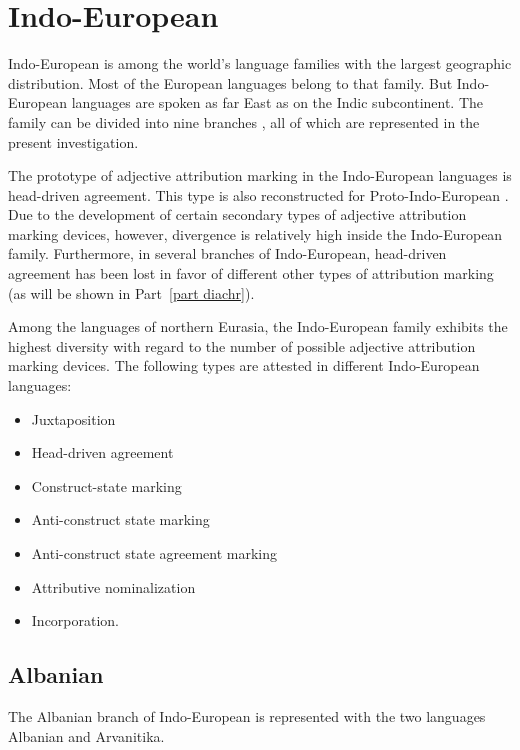 \section{Indo-European}
Indo-European is among the world's language families with the largest geographic distribution. Most of the European languages belong to that family. But Indo-European languages are spoken as far East as on the Indic subcontinent. The family can be divided into nine branches \cite[218]{salminen2007}, all of which are represented in the present investigation.

The prototype of adjective attribution marking in the Indo-European languages is head-driven agreement. This type is also reconstructed for Proto-Indo-European \citep{decsy1991,watkins1998}. Due to the development of certain secondary types of adjective attribution marking devices, however, divergence is relatively high inside the Indo-European family. Furthermore, in several branches of Indo-European, head-driven agreement has been lost in favor of different other types of attribution marking (as will be shown in Part~\ref{part diachr}).

Among the languages of northern Eurasia, the Indo-European family exhibits the highest diversity with regard to the number of possible adjective attribution marking devices. The following types are attested in different Indo-European languages:
\begin{itemize}
\item Juxtaposition
\item Head-driven agreement
\item Construct-state marking
\item Anti-construct state marking
\item Anti-construct state agreement marking
\item Attributive nominalization
\item Incorporation.
\end{itemize}

\subsection{Albanian} \label{albanian synchr}
The Albanian branch of Indo-European is represented with the two languages Albanian and Arvanitika.

